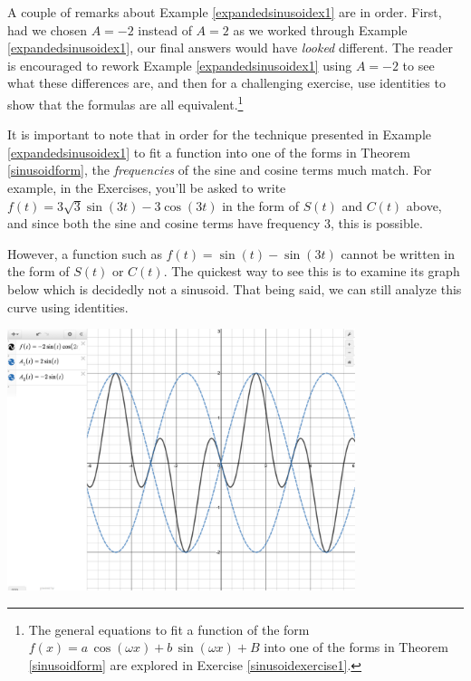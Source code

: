 \documentclass{ximera}
\begin{document}
A couple of remarks about Example \ref{expandedsinusoidex1} are in order.   First, had we chosen  $A = -2$ instead of $A = 2$ as we worked through Example \ref{expandedsinusoidex1}, our final answers would have \textit{looked} different. The reader is encouraged to rework Example  \ref{expandedsinusoidex1} using $A = -2$ to see what these differences are, and then for a challenging exercise, use identities to show that the formulas are all equivalent.\footnote{The general equations to fit a function of the form $f(x) = a \, \cos(\omega x) + b \, \sin(\omega x) + B$ into one of the forms in Theorem \ref{sinusoidform} are explored in Exercise \ref{sinusoidexercise1}.}

\smallskip

It is important to note that in order for the technique presented in Example \ref{expandedsinusoidex1} to fit a function into one of the forms in Theorem \ref{sinusoidform},  the \textit{frequencies} of the sine and cosine terms much match.  For example,  in the Exercises, you'll be asked to write $f(t) = 3\sqrt{3}\sin(3t) - 3\cos(3t)$ in the form of $S(t)$ and $C(t)$ above, and since both the sine and cosine terms have frequency $3$, this is possible.

\smallskip

However, a function such as  $f(t) = \sin(t) - \sin(3t)$ cannot be written in the form of $S(t)$ or $C(t)$. The quickest way to see this is to examine its graph below which is decidedly not a sinusoid.  That being said, we can still analyze this curve using identities.

\label{beats}

\smallskip


\begin{center}

\includegraphics[width=4in]{./MoreTrigonometricIdentitiesGraphics/Beats.jpg} 

\end{center}
\end{document}
